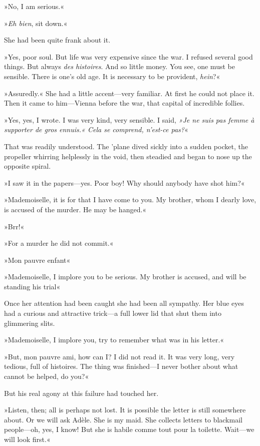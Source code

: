 »No, I am serious.«

»\textit{Eh bien}, sit down.«

She had been quite frank about it.

»Yes, poor soul. But life was very expensive since the war. I refused
several good things. But always \textit{des histoires}. And so little money.
You see, one must be sensible. There is one's old age. It is necessary
to be provident, \textit{hein}?«

»Assuredly.« She had a little accent—very familiar. At first he could
not place it. Then it came to him—Vienna before the war, that capital
of incredible follies.

»Yes, yes, I wrote. I was very kind, very sensible. I said, \foreignlanguage{french}{\textit{»Je ne suis pas femme à supporter de gros ennuis.« Cela se comprend, n'est-ce pas?}}«

That was readily understood. The 'plane dived sickly into a sudden pocket, the propeller whirring helplessly in the void, then steadied and began to nose up the opposite spiral.

»I saw it in the papers—yes. Poor boy! Why should anybody have shot him?«

»Mademoiselle, it is for that I have come to you. My brother, whom I dearly love, is accused of the murder. He may be hanged.«

»Brr!«

»For a murder he did not commit.«

»Mon pauvre enfant\longdash«

»Mademoiselle, I implore you to be serious. My brother is accused, and will be standing his trial\longdash«

Once her attention had been caught she had been all sympathy. Her blue eyes had a curious and attractive trick—a full lower lid that shut them into glimmering slits.

»Mademoiselle, I implore you, try to remember what was in his letter.«

»But, mon pauvre ami, how can I\@? I did not read it. It was very long, very tedious, full of histoires. The thing was finished—I never bother about what cannot be helped, do you?«

But his real agony at this failure had touched her.

»Listen, then; all is perhaps not lost. It is possible the letter is still somewhere about. Or we will ask Adèle. She is my maid. She collects letters to blackmail people—oh, yes, I know! But she is habile comme tout pour la toilette. Wait—we will look first.«


